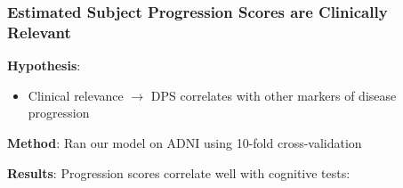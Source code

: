 \begin{frame}
\frametitle{Estimated Subject Progression Scores are Clinically Relevant}

\vspace{-2em}

\textbf{Hypothesis}: 
\begin{itemize}
 \item Clinical relevance $\rightarrow$ DPS correlates with other markers of disease progression
\end{itemize}

\vfill

\textbf{Method}: Ran our model on ADNI using 10-fold cross-validation

\vfill

\textbf{Results}: Progression scores correlate well with cognitive tests:



\newcommand{\figFont}{\small}
\newcommand{\pValFont}{\tiny}


\end{frame}
